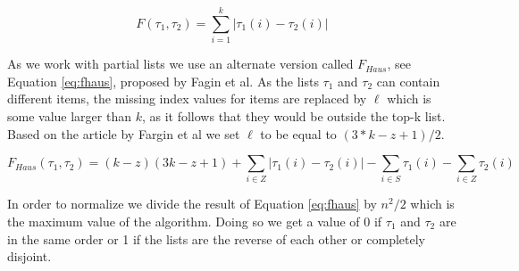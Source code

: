 \begin{equation}\label{eq:sfd}
F(\tau_1, \tau_2) = \sum_{i=1}^{k} | \tau_1 (i) - \tau_2 (i) |
\end{equation}

As we work with partial lists we use an alternate version called $F_{Haus}$, see Equation \ref{eq:fhaus}, proposed by Fagin et al\citep{comparing:topk}.
As the lists $\tau_1$ and $\tau_2$ can contain different items, the missing index values for items are replaced by $\ell$ which is some value larger than $k$, as it follows that they would be outside the top-k list. Based on the article by Fargin et al we set $\ell$ to be equal to $(3 * k - z + 1)/2$.

\footnotesize
\begin{equation}\label{eq:fhaus}
F_{Haus}(\tau_1,\tau_2)= (k-z)(3k-z+1)+\sum_{i\in Z} | \tau_1 (i) - \tau_2 (i) | - \sum_{i\in S} \tau_1 (i) - \sum_{i\in Z} \tau_2(i)
\end{equation}
\normalsize

In order to normalize we divide the result of Equation \ref{eq:fhaus} by $n^2 /2$ which is the maximum value of the algorithm. Doing so we get a value of 0 if $\tau_1$ and $\tau_2$ are in the same order or 1 if the lists are the reverse of each other or completely disjoint.
